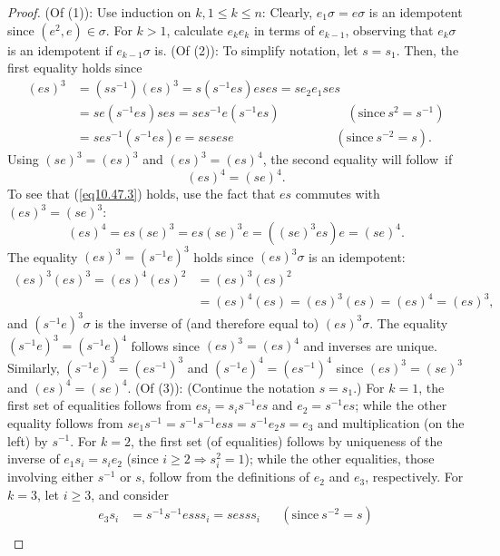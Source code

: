 \documentclass{surv-l}
\numberwithin{equation}{section}
\numberwithin{table}{section}
\numberwithin{figure}{section}
\theoremstyle{plain}
\theoremstyle{definition}
\begin{document}
\begin{proof}
(Of (1)): Use induction on $k, 1\leq k\leq n$: Clearly,
$e_{1}\sigma=e\sigma$ is an idempotent since $(e^{2},
e)\in\sigma$. For $k>1$, calculate $e_{k}e_{k}$ in terms of
$e_{k-1}$, observing that $e_{k}\sigma$ is an idempotent if
$e_{k-1}\sigma$ is. (Of (2)): To simplify notation, let $s=s_{1}$.
Then, the first equality holds since
\begin{align*}
(es)^3 &=(ss^{-1})(es)^{3}=s(s^{-1}es)eses=se_{2}e_{1} ses \\
&=se(s^{-1}es)ses=ses^{-1}e (s^{-1} es)\qquad\quad\qquad\; (\mathrm{since}\ s^{2}=s^{-1})\\
&=ses^{-1}(s^{-1}es)e=sesese\qquad\qquad\qquad\qquad (\mathrm{since}\ s^{-2}=s).
\end{align*}
Using $(se)^3 =(es)^{3}$ and $(es)^3 =(es)^{4}$, the second
equality will follow~if
\begin{equation}\label{eq10.47.3}
(es)^{4}=(se)^{4}.
\end{equation}
To see that (\ref{eq10.47.3}) holds, use the fact that $es$
commutes with $(es)^3 =(se)^{3}$:
\[
(es)^4=es(se)^{3}=es(se)^{3}e=((se)^{3}es)e=(se)^{4}.
\]
The equality $(es)^3 =(s^{-1}e)^{3}$ holds since
$(es)^{3}\sigma$ is an idempotent:
\begin{align*}
(es)^3 (es)^3 =(es)^{4} (es)^2 &=(es)^{3} (es)^2 \\
&=(es)^{4}(es)=(es)^{3}(es)=(es)^{4}=(es)^{3},
\end{align*}
and $(s^{-1}e)^{3}\sigma$ is the inverse of (and therefore
equal to) $(es)^{3}\sigma$. The equality
$(s^{-1}e)^{3}=(s^{-1}e)^{4}$ follows since $(es)^3 =(es)^{4}$
and inverses are unique. Similarly,
$(s^{-1}e)^{3}=(es^{-1})^{3}$ and
$(s^{-1}e)^{4}=(es^{-1})^{4}$ since $(es)^3 = (se)^3$ and
$(es)^{4}= (se)^4$. (Of (3)): (Continue the notation
$s=s_{1}.$) For $k=1$, the first set of equalities follows
from $es_{i}=s_{i}s^{-1} es$ and $e_{2}=s^{-1} es$; while the
other equality follows from
$se_{1}s^{-1}=s^{-1}s^{-1}ess=s^{-1}e_{2}s= e_3$ and
multiplication (on the left) by $s^{-1}$. For $k=2$, the first
set (of equalities) follows by uniqueness of the inverse of
$e_{1}s_{i}=s_{i}e_{2}$ (since $i\geq 2\Rightarrow
s_{i}^{2}=1$); while the other equalities, those involving
either $s^{-1}$ or $s$, follow from the definitions of $e_{2}$
and $e_{3}$, respectively. For $k=3$, let $i\geq 3$, and
consider
\begin{align*}
e_{3}s_{i}&=s^{-1}s^{-1}esss_{i}=sesss_{i}&& (\mathrm{since}\ s^{-2}=s) \\

\end{align*}
\end{proof}
\end{document}
